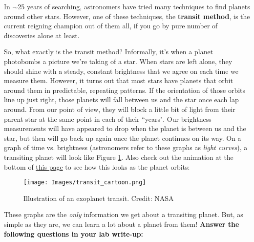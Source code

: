 \documentclass[12pt]{article}
\begin{document}
In $\sim$25 years of searching, astronomers have tried many techniques to find planets around other stars. However, one of these techniques, the \textbf{transit method}, is the current reigning champion out of them all, if you go by pure number of discoveries alone at least.

So, what exactly is the transit method? Informally, it’s when a planet photobombs a picture we’re taking of a star. When stars are left alone, they should shine with a steady, constant brightness that we agree on each time we measure them. However, it turns out that most stars have planets that orbit around them in predictable, repeating patterns. If the orientation of those orbits line up just right, those planets will fall between us and the star once each lap around. From our point of view, they will block a little bit of light from their parent star at the same point in each of their ``years". Our brightness measurements will have appeared to drop when the planet is between us and the star, but then will go back up again once the planet continues on its way. On a graph of time vs. brightness (astronomers refer to these graphs as \textit{light curves}), a transiting planet will look like Figure \ref{fig:transit}. Also check out the animation at the bottom of \href{https://exoplanets.nasa.gov/faq/31/whats-a-transit/}{this page} to see how this looks as the planet orbits: 

\begin{figure}[h!]
    \centering
    \texttt{[image: Images/transit\_cartoon.png]}
    \caption{Illustration of an exoplanet transit. Credit: NASA}
    \label{fig:transit}
\end{figure}
\newpage
\medskip \noindent
These graphs are the \textit{only} information we get about a transiting planet. But, as simple as they are, we can learn a lot about a planet from them!  \textbf{Answer the following questions in your lab write-up:}
\end{document}
